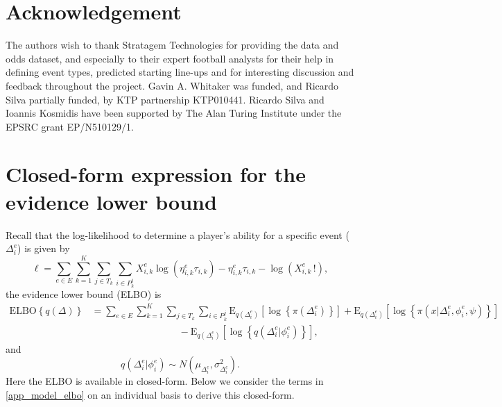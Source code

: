 \documentclass[11pt,a4paper]{article}
\newcommand{\expect}{\textrm{E}}
\newcommand{\elbo}{\textrm{ELBO}}
\begin{document}
\section*{Acknowledgement}
The authors wish to thank Stratagem Technologies for providing the data 
and odds dataset, and especially to their expert football analysts for 
their help in defining event types, predicted starting line-ups and 
for interesting discussion and feedback throughout the project. 
Gavin A. Whitaker was funded, and Ricardo Silva partially funded, by 
KTP partnership KTP010441. Ricardo Silva and Ioannis Kosmidis have been 
supported by The Alan Turing Institute under the EPSRC grant EP/N510129/1. 

























\appendix
\section{Closed-form expression for the evidence lower bound} \label{app_elbo}

Recall that the log-likelihood to determine a player's ability 
for a specific event ($\Delta_i^e$) is given by 
\begin{equation}
\ell = \sum_{e\in E}\sum_{k=1}^K\sum_{j\in T_k}\sum_{i\in P_k^j} X_{i,k}^{e} \log{\left(\eta_{i,k}^{e}\tau_{i,k} \right)} - \eta_{i,k}^{e}\tau_{i,k} - \log{\left(X_{i,k}^{e}\,! \right)}, \label{app_llike}
\end{equation}
the evidence lower bound (ELBO) is 
\begin{align}
\elbo\left\{q\left(\Delta\right)\right\} & = \sum_{e\in E}\sum_{k=1}^K\sum_{j\in T_k}\sum_{i\in P_k^j} \expect_{q\left(\Delta_i^{e}\right)}\left[\log\left\{\pi\left(\Delta_i^{e}\right)\right\}\right] + \expect_{q\left(\Delta_i^{e}\right)}\left[\log\left\{\pi\left(x\vert\Delta_i^{e},\phi_i^{e},\psi\right)\right\}\right] \nonumber\\
&\qquad\qquad\qquad\qquad\quad- \expect_{q\left(\Delta_i^{e}\right)}\left[\log\left\{q\left(\Delta_i^{e}\vert\phi_i^{e}\right)\right\}\right],  \label{app_model_elbo}
\end{align}
and
\begin{equation}\label{app_qDelta_single}
q\left(\Delta_i^{e}\vert\phi_i^{e} \right)\sim N\left(\mu_{\Delta_i^{e}}, \sigma_{\Delta_i^{e}}^2 \right). 
\end{equation}
Here the ELBO is available in closed-form. 
Below we consider the terms in \eqref{app_model_elbo} on an 
individual basis to derive this closed-form. 
\end{document}
